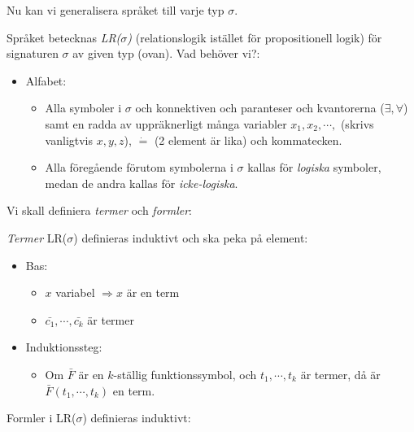 \noindent Nu kan vi generalisera språket till varje typ $\sigma$.
\par\bigskip
\noindent Språket betecknas \textit{LR($\sigma$)} (relationslogik istället för propositionell logik) för signaturen $\sigma$ av given typ (ovan). Vad behöver vi?:
\begin{itemize}
  \item Alfabet:
    \begin{itemize}
      \item Alla symboler i $\sigma$ och konnektiven och paranteser och kvantorerna ($\exists,\forall$) samt en radda av uppräknerligt många variabler $x_1,x_2,\cdots,$ (skrivs vanligtvis $x,y,z$), $\dot{=}$ (2 element är lika) och kommatecken.
      \item Alla föregående förutom symbolerna i $\sigma$ kallas för \textit{logiska} symboler, medan de andra kallas för \textit{icke-logiska}. 
    \end{itemize}
\end{itemize}
\par\bigskip
\noindent Vi skall definiera \textit{termer} och \textit{formler}:
\par\bigskip
\noindent \textit{Termer} LR($\sigma$) definieras induktivt och ska peka på element:
\par\bigskip
\begin{itemize}
  \item Bas:
    \begin{itemize}
      \item $x$ variabel $\Rightarrow x$ är en term
      \item $\bar{c_1},\cdots,\bar{c_k}$ är termer
    \end{itemize}
  \item Induktionssteg:
    \begin{itemize}
      \item Om $\bar{F}$ är en $k$-ställig funktionssymbol, och $t_1,\cdots, t_k$ är termer, då är $\bar{F}(t_1,\cdots, t_k)$ en term.
    \end{itemize}
\end{itemize}
\par\bigskip
\noindent Formler i LR($\sigma$) definieras induktivt:
\par\bigskip
